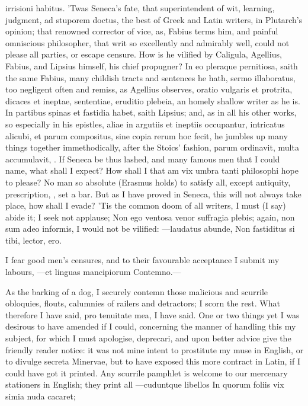 {irrisioni habitus. 'Twas Seneca's fate, that superintendent of
wit, learning, judgment, ad stuporem doctus, the best of Greek and
Latin writers, in Plutarch's opinion; that renowned corrector of vice,
as, Fabius terms him, and painful omniscious philosopher, that
writ so excellently and admirably well, could not please all parties,
or escape censure. How is he vilified by  Caligula, Agellius,
Fabius, and Lipsius himself, his chief propugner? In eo pleraque
pernitiosa, saith the same Fabius, many childish tracts and sentences
he hath, sermo illaboratus, too negligent often and remiss, as Agellius
observes, oratio vulgaris et protrita, dicaces et ineptae, sententiae,
eruditio plebeia, an homely shallow writer as he is. In partibus spinas
et fastidia habet, saith Lipsius; and, as in all his other works,
so especially in his epistles, aliae in argutiis et ineptiis
occupantur, intricatus alicubi, et parum compositus, sine copia rerum
hoc fecit, he jumbles up many things together immethodically, after the
Stoics' fashion, parum ordinavit, multa accumulavit, \etc. If Seneca be
thus lashed, and many famous men that I could name, what shall I
expect? How shall I that am vix umbra tanti philosophi hope to please?
No man so absolute (Erasmus holds) to satisfy all, except
antiquity, prescription, \etc, set a bar. But as I have proved in
Seneca, this will not always take place, how shall I evade? 'Tis the
common doom of all writers, I must (I say) abide it; I seek not
applause; Non ego ventosa venor suffragia plebis; again, non sum
adeo informis, I would not be vilified:
---laudatus abunde,
Non fastiditus si tibi, lector, ero.

I fear good men's censures, and to their favourable acceptance I submit
my labours,
---et linguas mancipiorum
Contemno.---

As the barking of a dog, I securely contemn those malicious and
scurrile obloquies, flouts, calumnies of railers and detractors; I
scorn the rest. What therefore I have said, pro tenuitate mea, I have
said.
One or two things yet I was desirous to have amended if I could,
concerning the manner of handling this my subject, for which I must
apologise, deprecari, and upon better advice give the friendly reader
notice: it was not mine intent to prostitute my muse in English, or to
divulge secreta Minervae, but to have exposed this more contract in
Latin, if I could have got it printed. Any scurrile pamphlet is welcome
to our mercenary stationers in English; they print all
---cuduntque libellos
In quorum foliis vix simia nuda cacaret;

}
